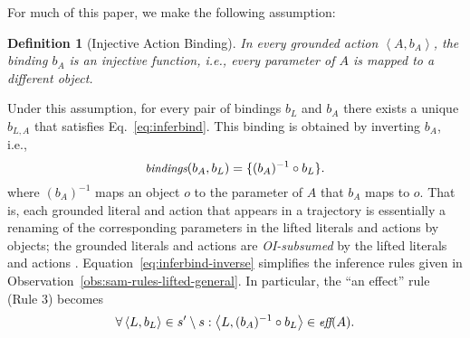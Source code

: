 \documentclass{article}
\newtheorem{observation}{Observation}
\newtheorem{definition}{Definition}
\newcommand{\tuple}[1]{\ensuremath{\left \langle #1 \right \rangle }}
\newcommand{\pre}{\textit{pre}}
\newcommand{\eff}{\textit{eff}}
\newcommand{\liftl}{L}
\newcommand{\lifta}{A}
\newcommand{\bindings}{\textit{bindings}}
\begin{document}
\noindent
For much of this paper, we make the following assumption:
\begin{definition}[Injective Action Binding]
In every grounded action $\tuple{\lifta, b_\lifta}$, the binding $b_\lifta$ is an injective function, 
i.e., every parameter of $\lifta$ is mapped to a different object. 
\label{def:injective}
\end{definition}
Under this assumption, for every pair of bindings $b_\liftl$ and $b_\lifta$ 
there exists a unique $b_{\liftl,\lifta}$ that satisfies Eq.~\ref{eq:inferbind}. 
This binding is obtained by inverting $b_\lifta$, i.e., 
\begin{equation}\small
    \bindings(b_\lifta, b_\liftl) = \{ (b_\lifta)^{-1}\circ b_\liftl \}.
    \label{eq:inferbind-inverse}
\end{equation}
where $(b_\lifta)^{-1}$ maps an object $o$ to the parameter of $\lifta$ that $b_\lifta$ maps to $o$. %
That is, each grounded literal and action that appears in a trajectory is essentially a renaming of the corresponding parameters in the lifted literals and actions by objects; the grounded literals and actions are \emph{OI-subsumed} by the lifted literals and actions \cite[Section 5.5.1]{deraedt08}.
Equation~\ref{eq:inferbind-inverse} simplifies the inference rules given in Observation~\ref{obs:sam-rules-lifted-general}. 
In particular, the ``an effect'' rule (Rule 3) becomes
\begin{equation}\small
    \forall \tuple{\liftl,b_\liftl} \in s'\setminus s: 
     \tuple{\liftl,(b_\lifta)^{-1}\circ b_\liftl} \in \eff(\lifta).
\end{equation}
    

\end{document}
